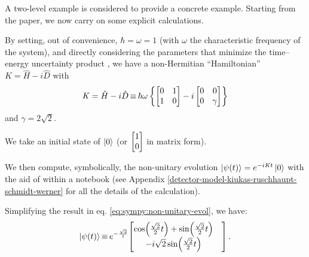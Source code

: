A two-level example is considered to provide a concrete example.
Starting from the paper, we now carry on some explicit calculations.

By setting, out of convenience, $\hbar = \omega = 1$
(with $\omega$ the characteristic frequency of the system),
and directly considering the parameters
that minimize the time--energy uncertainty product \parencite{RuschhauptAbsorption},
we have a non-Hermitian ``Hamiltonian''
$\mathit{K} = \hat{H} - i\hat{D}$ with
\begin{equation}\label{eq:complexpot}
  \mathit{K} = \hat{H} - i\hat{D} \operatorname*{\equiv}
    \hbar\omega\left\{
      \left[\begin{matrix}0 & 1\\1 & 0\end{matrix}\right] -
      i \left[\begin{matrix}0 & 0\\0 & \gamma \end{matrix}\right]
    \right\}
\end{equation}
and $\gamma = 2\sqrt{2}$.

We take an initial state of $\ket{0}$
(or $\mqty[1\\0]$ in matrix form).

We then compute, symbolically, the non-unitary evolution
$\ket{\psi(t)} = e^{-i\mathit{K}t}\ket{0}$
with the aid of  \parencite{comp:sympy} within a  \parencite{comp:jupyter} notebook
(see Appendix \ref{detector-model-kiukas-ruschhaupt-schmidt-werner} for all the details of the calculation).

Simplifying the result in eq. \eqref{eq:sympy:non-unitary-evol}, we have:
\begin{equation}
  \ket{\psi(t)} \repr e^{-\frac{\sqrt{2}}{t}} \mqty[
    \cos(\frac{\sqrt{2}}{2}t) + \sin(\frac{\sqrt{2}}{2}t)& \\
                     -i\sqrt{2} \sin(\frac{\sqrt{2}}{2}t)&
  ] \,\text{.}
\end{equation}

